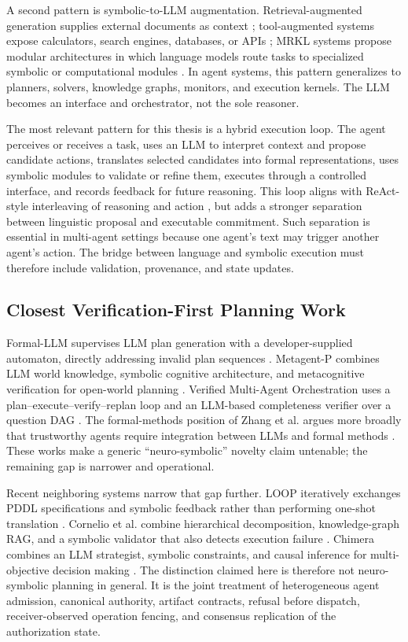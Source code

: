 A second pattern is symbolic-to-LLM augmentation. Retrieval-augmented generation supplies external documents as context \cite{lewis2020retrieval}; tool-augmented systems expose calculators, search engines, databases, or APIs \cite{schick2023toolformer,mialon2023augmented}; MRKL systems propose modular architectures in which language models route tasks to specialized symbolic or computational modules \cite{karpas2022mrkl}. In agent systems, this pattern generalizes to planners, solvers, knowledge graphs, monitors, and execution kernels. The LLM becomes an interface and orchestrator, not the sole reasoner.

The most relevant pattern for this thesis is a hybrid execution loop. The agent perceives or receives a task, uses an LLM to interpret context and propose candidate actions, translates selected candidates into formal representations, uses symbolic modules to validate or refine them, executes through a controlled interface, and records feedback for future reasoning. This loop aligns with ReAct-style interleaving of reasoning and action \cite{yao2023react}, but adds a stronger separation between linguistic proposal and executable commitment. Such separation is essential in multi-agent settings because one agent's text may trigger another agent's action. The bridge between language and symbolic execution must therefore include validation, provenance, and state updates.

\subsection{Closest Verification-First Planning Work}

Formal-LLM supervises LLM plan generation with a developer-supplied automaton, directly addressing invalid plan sequences \cite{li2024formalllm}. Metagent-P combines LLM world knowledge, symbolic cognitive architecture, and metacognitive verification for open-world planning \cite{zhou2025metagentp}. Verified Multi-Agent Orchestration uses a plan--execute--verify--replan loop and an LLM-based completeness verifier over a question DAG \cite{zhang2026vmao}. The formal-methods position of Zhang et al. argues more broadly that trustworthy agents require integration between LLMs and formal methods \cite{zhang2025trustworthy}. These works make a generic ``neuro-symbolic'' novelty claim untenable; the remaining gap is narrower and operational.

Recent neighboring systems narrow that gap further. LOOP iteratively exchanges PDDL specifications and symbolic feedback rather than performing one-shot translation \cite{virwani2025loop}. Cornelio et al. combine hierarchical decomposition, knowledge-graph RAG, and a symbolic validator that also detects execution failure \cite{cornelio2025hierarchical}. Chimera combines an LLM strategist, symbolic constraints, and causal inference for multi-objective decision making \cite{akarlar2025chimera}. The distinction claimed here is therefore not neuro-symbolic planning in general. It is the joint treatment of heterogeneous agent admission, canonical authority, artifact contracts, refusal before dispatch, receiver-observed operation fencing, and consensus replication of the authorization state.

